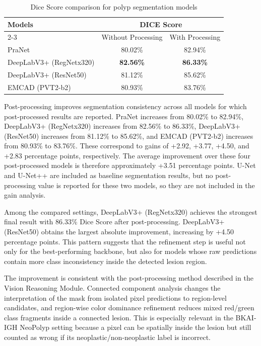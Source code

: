 \begin{table}[H]
\centering
\begin{tabular}{l c c}
\hline\hline
\multirow{2}{*}{Models} & \multicolumn{2}{c}{DICE Score} \\
\cline{2-3}
 & Without Processing & With Processing \\
\hline
PraNet & 80.02\% & 82.94\% \\
DeepLabV3+ (RegNetx320) & \textbf{82.56\%} & \textbf{86.33\%} \\
DeepLabV3+ (ResNet50) & 81.12\% & 85.62\% \\
EMCAD (PVT2-b2) & 80.93\% & 83.76\% \\
\hline\hline
\end{tabular}
\caption{Dice Score comparison for polyp segmentation models}
\label{table:dice-scores}
\end{table}

Post-processing improves segmentation consistency across all models for which post-processed results are reported. PraNet increases from 80.02\% to 82.94\%, DeepLabV3+ (RegNetx320) increases from 82.56\% to 86.33\%, DeepLabV3+ (ResNet50) increases from 81.12\% to 85.62\%, and EMCAD (PVT2-b2) increases from 80.93\% to 83.76\%. These correspond to gains of +2.92, +3.77, +4.50, and +2.83 percentage points, respectively. The average improvement over these four post-processed models is therefore approximately +3.51 percentage points. U-Net and U-Net++ are included as baseline segmentation results, but no post-processing value is reported for these two models, so they are not included in the gain analysis.

Among the compared settings, DeepLabV3+ (RegNetx320) achieves the strongest final result with 86.33\% Dice Score after post-processing. DeepLabV3+ (ResNet50) obtains the largest absolute improvement, increasing by +4.50 percentage points. This pattern suggests that the refinement step is useful not only for the best-performing backbone, but also for models whose raw predictions contain more class inconsistency inside the detected lesion region.

The improvement is consistent with the post-processing method described in the Vision Reasoning Module. Connected component analysis changes the interpretation of the mask from isolated pixel predictions to region-level candidates, and region-wise color dominance refinement reduces mixed red/green class fragments inside a connected lesion. This is especially relevant in the BKAI-IGH NeoPolyp setting because a pixel can be spatially inside the lesion but still counted as wrong if its neoplastic/non-neoplastic label is incorrect.

